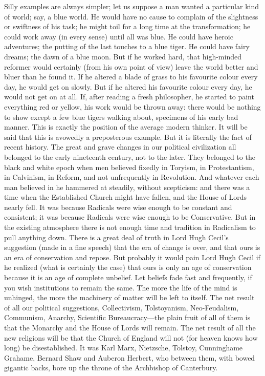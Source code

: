 Silly examples are always simpler; let us suppose a man wanted a particular kind of world; say, a blue world. He would have no cause to complain of the slightness or swiftness of his task; he might toil for a long time at the transformation; he could work away (in every sense) until all was blue. He could have heroic adventures; the putting of the last touches to a blue tiger. He could have fairy dreams; the dawn of a blue moon. But if he worked hard, that high-minded reformer would certainly (from his own point of view) leave the world better and bluer than he found it. If he altered a blade of grass to his favourite colour every day, he would get on slowly. But if he altered his favourite colour every day, he would not get on at all. If, after reading a fresh philosopher, he started to paint everything red or yellow, his work would be thrown away: there would be nothing to show except a few blue tigers walking about, specimens of his early bad manner. This is exactly the position of the average modern thinker. It will be said that this is avowedly a preposterous example. But it is literally the fact of recent history. The great and grave changes in our political civilization all belonged to the early nineteenth century, not to the later. They belonged to the black and white epoch when men believed fixedly in Toryism, in Protestantism, in Calvinism, in Reform, and not unfrequently in Revolution. And whatever each man believed in he hammered at steadily, without scepticism: and there was a time when the Established Church might have fallen, and the House of Lords nearly fell. It was because Radicals were wise enough to be constant and consistent; it was because Radicals were wise enough to be Conservative. But in the existing atmosphere there is not enough time and tradition in Radicalism to pull anything down. There is a great deal of truth in Lord Hugh Cecil’s suggestion (made in a fine speech) that the era of change is over, and that ours is an era of conservation and repose. But probably it would pain Lord Hugh Cecil if he realized (what is certainly the case) that ours is only an age of conservation because it is an age of complete unbelief. Let beliefs fade fast and frequently, if you wish institutions to remain the same. The more the life of the mind is unhinged, the more the machinery of matter will be left to itself. The net result of all our political suggestions, Collectivism, Tolstoyanism, Neo-Feudalism, Communism, Anarchy, Scientific Bureaucracy—the plain fruit of all of them is that the Monarchy and the House of Lords will remain. The net result of all the new religions will be that the Church of England will not (for heaven knows how long) be disestablished. It was Karl Marx, Nietzsche, Tolstoy, Cunninghame Grahame, Bernard Shaw and Auberon Herbert, who between them, with bowed gigantic backs, bore up the throne of the Archbishop of Canterbury.


